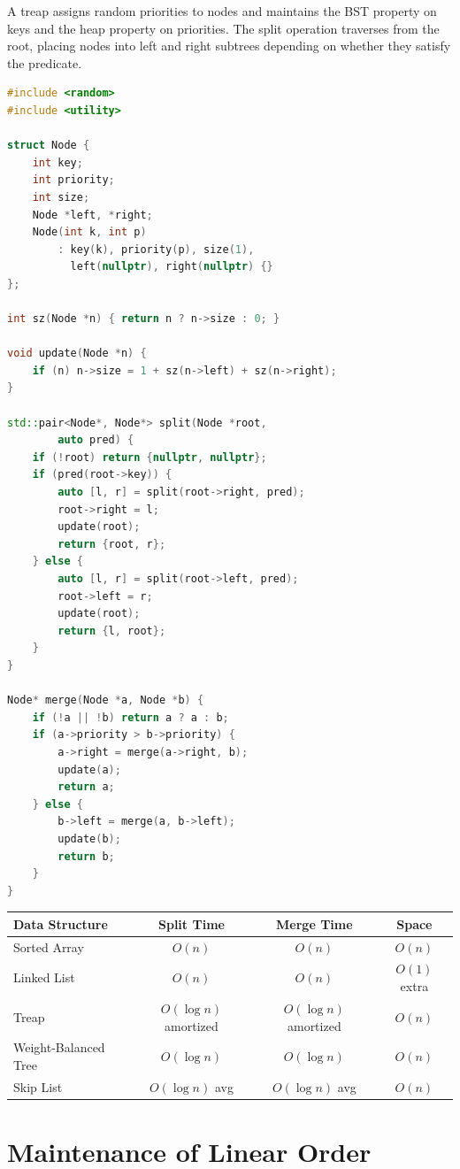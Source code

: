 A treap assigns random priorities to nodes and maintains the BST property on keys and the heap property on priorities. The split operation traverses from the root, placing nodes into left and right subtrees depending on whether they satisfy the predicate.

\begin{lstlisting}[language=C++]
#include <random>
#include <utility>

struct Node {
    int key;
    int priority;
    int size;
    Node *left, *right;
    Node(int k, int p)
        : key(k), priority(p), size(1),
          left(nullptr), right(nullptr) {}
};

int sz(Node *n) { return n ? n->size : 0; }

void update(Node *n) {
    if (n) n->size = 1 + sz(n->left) + sz(n->right);
}

std::pair<Node*, Node*> split(Node *root,
        auto pred) {
    if (!root) return {nullptr, nullptr};
    if (pred(root->key)) {
        auto [l, r] = split(root->right, pred);
        root->right = l;
        update(root);
        return {root, r};
    } else {
        auto [l, r] = split(root->left, pred);
        root->left = r;
        update(root);
        return {l, root};
    }
}

Node* merge(Node *a, Node *b) {
    if (!a || !b) return a ? a : b;
    if (a->priority > b->priority) {
        a->right = merge(a->right, b);
        update(a);
        return a;
    } else {
        b->left = merge(a, b->left);
        update(b);
        return b;
    }
}
\end{lstlisting}

\begin{center}
\begin{tabular}{lccc}
\toprule
Data Structure & Split Time & Merge Time & Space \\
\midrule
Sorted Array & $O(n)$ & $O(n)$ & $O(n)$ \\
Linked List & $O(n)$ & $O(n)$ & $O(1)$ extra \\
Treap & $O(\log n)$ amortized & $O(\log n)$ amortized & $O(n)$ \\
Weight-Balanced Tree & $O(\log n)$ & $O(\log n)$ & $O(n)$ \\
Skip List & $O(\log n)$ avg & $O(\log n)$ avg & $O(n)$ \\
\bottomrule
\end{tabular}
\end{center}

\section{Maintenance of Linear Order}
\label{sec:linear-order}

